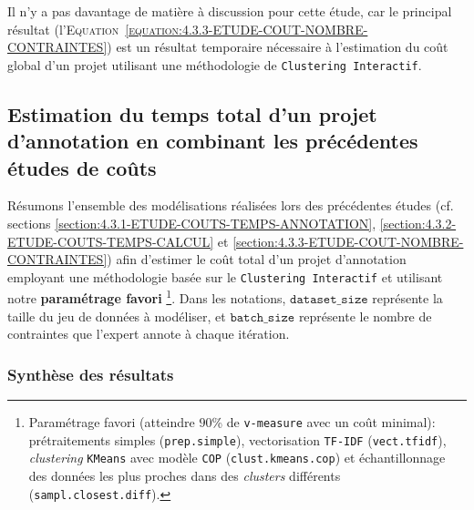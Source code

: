 			\begin{leftBarAuthorOpinion}
				Il n'y a pas davantage de matière à discussion pour cette étude, car le principal résultat (l'\textsc{Equation~\ref{equation:4.3.3-ETUDE-COUT-NOMBRE-CONTRAINTES}}) est un résultat temporaire nécessaire à l'estimation du coût global d'un projet utilisant une méthodologie de \texttt{Clustering Interactif}.
			\end{leftBarAuthorOpinion}
	
	\subsection{Estimation du temps total d'un projet d'annotation en combinant les précédentes études de coûts}
	\label{section:4.3.4-ETUDE-COUTS-TOTAL}
	
		Résumons l'ensemble des modélisations réalisées lors des précédentes études (cf. sections \ref{section:4.3.1-ETUDE-COUTS-TEMPS-ANNOTATION}, \ref{section:4.3.2-ETUDE-COUTS-TEMPS-CALCUL} et \ref{section:4.3.3-ETUDE-COUT-NOMBRE-CONTRAINTES}) afin d'estimer le coût total d'un projet d'annotation employant une méthodologie basée sur le \texttt{Clustering Interactif} et utilisant notre \textbf{paramétrage favori} \footnote{
			Paramétrage favori (atteindre $90$\% de \texttt{v-measure} avec un coût minimal): prétraitements simples (\texttt{prep.simple}), vectorisation \texttt{TF-IDF} (\texttt{vect.tfidf}), \textit{clustering} \texttt{KMeans} avec modèle \texttt{COP} (\texttt{clust.kmeans.cop}) et échantillonnage des données les plus proches dans des \textit{clusters} différents (\texttt{sampl.closest.diff}).
		}.
		Dans les notations, $\texttt{dataset\_size}$ représente la taille du jeu de données à modéliser, et $\texttt{batch\_size}$ représente le nombre de contraintes que l'expert annote à chaque itération.

		\subsubsection{Synthèse des résultats}
			
